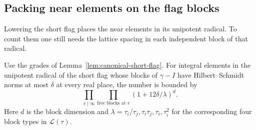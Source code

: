 \subsection{Packing near elements on the flag blocks}

Lowering the short flag places the near elements in its unipotent radical. To count them one still needs the lattice spacing in each independent block of that radical.

\begin{lemma}
\label{lem:near-flag-packing}
Use the grades of Lemma~\ref{lem:canonical-short-flag}.
For integral elements in the unipotent radical of the short flag
whose blocks of \(\gamma-I\) have Hilbert--Schmidt norms at
most \(\delta\) at every real place, the number is bounded by 
\[
 \prod_{v\mid\infty}\prod_{\text{free blocks at }v}(1+12\delta/\lambda)^d.
\]
 Here \(d\) is the block
dimension and
\(\lambda=\tau_i/\tau_j,\tau_i\tau_j,\tau_i,\tau_i^2\)
for the corresponding four block types in \(\mathcal L(\tau)\).
\end{lemma}

